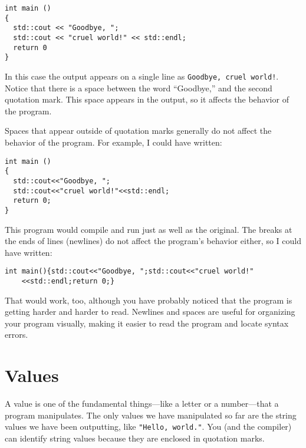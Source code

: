 \begin{mdframed}

\begin{verbatim}
int main ()
{
  std::cout << "Goodbye, ";
  std::cout << "cruel world!" << std::endl;
  return 0
}
\end{verbatim}
%
\end{mdframed}
In this case the output appears on a single line as
{\tt Goodbye, cruel world!}.  Notice that there is a space
between the word ``Goodbye,'' and the second quotation mark.
This space appears in the output, so it affects the behavior
of the program.

Spaces that appear outside of quotation marks generally do
not affect the behavior of the program.  For example, I
could have written:

\begin{mdframed}

\begin{verbatim}
int main ()
{
  std::cout<<"Goodbye, ";
  std::cout<<"cruel world!"<<std::endl;
  return 0;
}
\end{verbatim}
%
\end{mdframed}
This program would compile and run just as well as the original.
The breaks at the ends of lines (newlines) do not affect
the program's behavior either, so I could have written:

\begin{mdframed}

\begin{verbatim}
int main(){std::cout<<"Goodbye, ";std::cout<<"cruel world!"
    <<std::endl;return 0;}
\end{verbatim}
%
\end{mdframed}
That would work, too, although you have probably noticed that
the program is getting harder and harder to read.  Newlines and
spaces are useful for organizing your program visually, making
it easier to read the program and locate syntax errors.

\section{Values}

A value is one of the fundamental things---like a letter or
a number---that a program manipulates.  The only values we have
manipulated so far are the string values we have been outputting, like
{\tt "Hello, world."}.  You (and the compiler) can identify
string values because they are enclosed in quotation marks.

